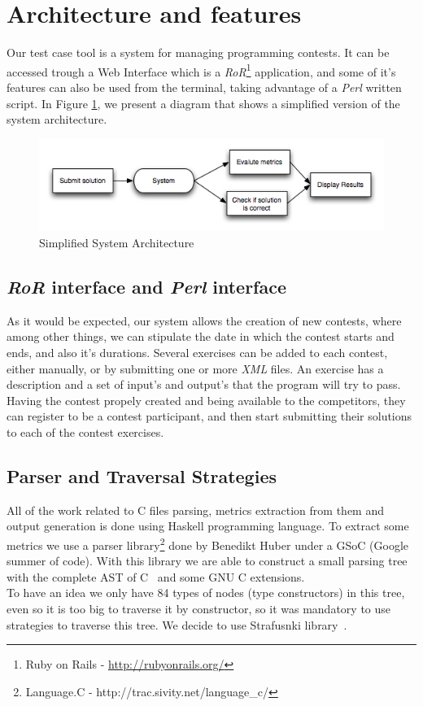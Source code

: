\section{Architecture and features}
Our test case tool is a system for managing programming contests.
It can be accessed trough a Web Interface which is a \textit{RoR}\footnote{Ruby on Rails - \url{http://rubyonrails.org/}} application,
and some of it's features can also be used from the terminal, taking advantage of a \textit{Perl} written script.
In Figure \ref{fig:arq}, we present a diagram that shows a simplified version of the system architecture.
\begin{figure}[htbp]
\includegraphics[scale=0.7]{images/arq}
\caption{Simplified System Architecture}
\label{fig:arq}
\end{figure}
\subsection{\textit{RoR} interface and \textit{Perl} interface}
As it would be expected, our system allows the creation of new contests, where among other things,
we can stipulate the date in which the contest starts and ends, and also it's durations.
Several exercises can be added to each contest, either manually, or by submitting one or more \textit{XML} files.
An exercise has a description and a set of input's and output's that the program will try to pass.
Having the contest propely created and being available to the competitors, they can register to be a contest participant,
and then start submitting their solutions to each of the contest exercises.

\subsection{Parser and Traversal Strategies}
All of the work related to C files parsing, metrics extraction from them and output generation is done
using Haskell programming language. To extract some metrics we use a parser
library\footnote{Language.C - http://trac.sivity.net/language\_c/} done by Benedikt Huber under a GSoC (Google summer of code).
With this library we are able to construct a small parsing tree with the complete AST of C~\cite{Kernighan:1988:CPL:576122} and some GNU C extensions.\\
\indent To have an idea we only have 84 types of nodes (type constructors) in this tree, even so it is too big to traverse it by constructor, so
it was mandatory to use strategies to traverse this tree. We decide to use Strafusnki library~\cite{LV03-PADL}.

